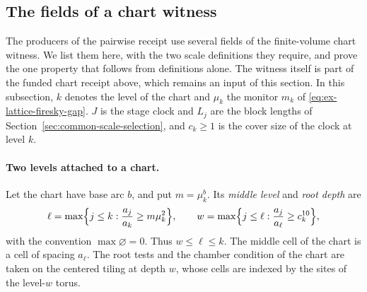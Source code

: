 \subsection{The fields of a chart witness}
\label{subsec:ex-lattice-firesky-witness}

The producers of the pairwise receipt use several fields of the
finite-volume chart witness. We list them here, with the two scale
definitions they require, and prove the one property that follows from
definitions alone. The witness itself is part of the funded chart receipt
above, which remains an input of this section. In this subsection, $k$
denotes the level of the chart and $\mu_k$ the monitor $m_k$ of
\eqref{eq:ex-lattice-firesky-gap}. $J$ is the stage clock and $L_j$ are
the block lengths of Section~\ref{sec:common-scale-selection}, and
$c_k\ge1$ is the cover size of the clock at level $k$.

\paragraph{Two levels attached to a chart.}
Let the chart have base arc $b$, and put $m=\mu_k^b$. Its \emph{middle
level} and \emph{root depth} are
\[
 \ell=\max\Bigl\{j\le k:\frac{a_j}{a_k}\ge m\mu_k^{2}\Bigr\},\qquad
 w=\max\Bigl\{j\le\ell:\frac{a_j}{a_\ell}\ge c_k^{10}\Bigr\},
\]
with the convention $\max\varnothing=0$. Thus $w\le\ell\le k$. The middle
cell of the chart is a cell of spacing $a_\ell$. The root tests and the
chamber condition of the chart are taken on the centered tiling at depth
$w$, whose cells are indexed by the sites of the level-$w$ torus.

